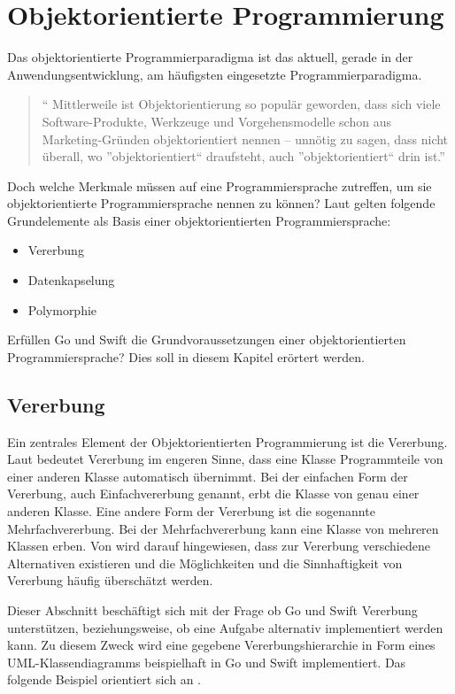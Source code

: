 \chapter{Objektorientierte Programmierung}
Das objektorientierte Programmierparadigma ist das aktuell, gerade in der Anwendungsentwicklung, am häufigsten eingesetzte Programmierparadigma.

\begin{quote}
\enquote{
Mittlerweile ist Objektorientierung so populär geworden, dass sich viele Software-Produkte, Werkzeuge und Vorgehensmodelle schon aus Marketing-Gründen objektorientiert nennen – unnötig zu sagen, dass nicht überall, wo ”objektorientiert“ draufsteht, auch ”objektorientiert“ drin ist.} 
\cite[S.16]{PoetzschHeffter.2009}
\end{quote}

Doch welche Merkmale müssen auf eine Programmiersprache zutreffen, um sie objektorientierte Programmiersprache nennen zu können?
Laut \cite{Lahres.2011} gelten folgende Grundelemente als Basis einer objektorientierten Programmiersprache:

\begin{itemize}
    \item Vererbung
    \item Datenkapselung
    \item Polymorphie
\end{itemize}

Erfüllen Go und Swift die Grundvoraussetzungen einer objektorientierten Programmiersprache? Dies soll in diesem Kapitel erörtert werden.

\section{Vererbung}
Ein zentrales Element der Objektorientierten Programmierung ist die Vererbung. 
Laut \cite[S. 145]{PoetzschHeffter.2009} bedeutet Vererbung im engeren Sinne, dass eine Klasse Programmteile von einer anderen Klasse automatisch übernimmt. 
Bei der einfachen Form der Vererbung, auch Einfachvererbung genannt, erbt die Klasse von genau einer anderen Klasse.
Eine andere Form der Vererbung ist die sogenannte Mehrfachvererbung. 
Bei der Mehrfachvererbung kann eine Klasse von mehreren Klassen erben.
Von \cite[S.41]{Oestereich.1999} wird darauf hingewiesen, dass zur Vererbung  verschiedene Alternativen existieren und die Möglichkeiten und die Sinnhaftigkeit von Vererbung häufig überschätzt werden.


Dieser Abschnitt beschäftigt sich mit der Frage ob Go und Swift Vererbung unterstützen, beziehungsweise, ob eine Aufgabe alternativ implementiert werden kann.
Zu diesem Zweck wird eine gegebene Vererbungshierarchie in Form eines UML-Klassendiagramms beispielhaft in Go und Swift implementiert. 
Das folgende Beispiel orientiert sich an \cite[]{WilliamKennedy.2013}.

